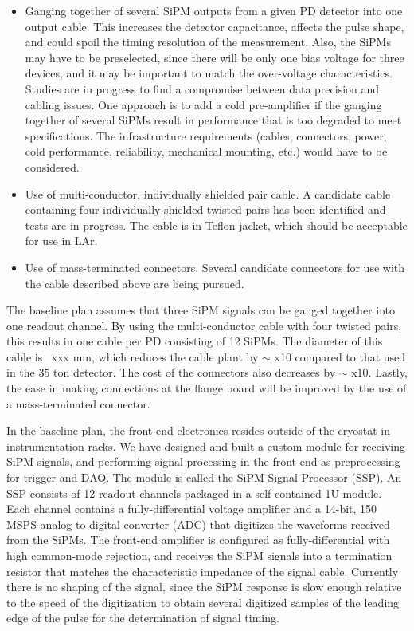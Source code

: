 \begin{itemize}
\item Ganging together of several SiPM outputs from a given PD
  detector into one output cable.  This increases the detector
  capacitance, affects the pulse shape, and could spoil the timing
  resolution of the measurement.  Also, the SiPMs may have to be
  preselected, since there will be only one bias voltage for three
  devices, and it may be important to match the over-voltage
  characteristics.  Studies are in progress to find a compromise
  between data precision and cabling issues. One approach is to add a
  cold pre-amplifier if the ganging together of several SiPMs result
  in performance that is too degraded to meet specifications.  The
  infrastructure requirements (cables, connectors, power, cold
  performance, reliability, mechanical mounting, etc.) would have to
  be considered.

\item Use of multi-conductor, individually shielded pair cable.  A candidate cable containing four individually-shielded twisted pairs has been 
identified and tests are in progress.  The cable is in Teflon jacket, which should be acceptable for use in LAr.

\item Use of mass-terminated connectors.  Several candidate connectors
  for use with the cable described above are being pursued.
\end{itemize}

The baseline plan assumes that three SiPM signals can be ganged
together into one readout channel.  By using the multi-conductor cable
with four twisted pairs, this results in one cable per PD consisting
of 12 SiPMs.  The diameter of this cable is ~xxx mm, which reduces the
cable plant by $\sim$ x10 compared to that used in the 35 ton
detector.  The cost of the connectors also decreases by $\sim$ x10.
Lastly, the ease in making connections at the flange board will be
improved by the use of a mass-terminated connector.

In the baseline plan, the front-end electronics resides outside of the
cryostat in instrumentation racks.  We have designed and built a
custom module for receiving SiPM signals, and performing signal
processing in the front-end as preprocessing for trigger and DAQ.  The
module is called the SiPM Signal Processor (SSP).  An SSP consists of
12 readout channels packaged in a self-contained 1U module.  Each
channel contains a fully-differential voltage amplifier and a 14-bit,
150 MSPS analog-to-digital converter (ADC) that digitizes the
waveforms received from the SiPMs.  The front-end amplifier is
configured as fully-differential with high common-mode rejection, and
receives the SiPM signals into a termination resistor that matches the
characteristic impedance of the signal cable.  Currently there is no
shaping of the signal, since the SiPM response is slow enough relative
to the speed of the digitization to obtain several digitized samples
of the leading edge of the pulse for the determination of signal
timing.

